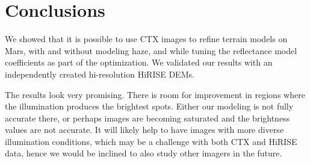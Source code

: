 \documentclass[draft,linenumbers]{agujournal}
\begin{document}
\section{Conclusions}

We showed that it is possible to use CTX images to refine terrain models on Mars, with and without modeling haze, and while tuning the reflectance model coefficients as part of the optimization. We validated our results with an independently created hi-resolution HiRISE DEMs. 

The results look very promising. There is room for improvement in regions where the illumination produces the brightest spots. Either our modeling is not fully accurate there, or perhaps images are becoming saturated and the brightness values are not accurate. It will likely help to have images with more diverse illumination conditions, which may be a challenge with both CTX and HiRISE data, hence we would be inclined to also study other imagers in the future. 






%
%
%
%
%
%
%
%
\end{document}
